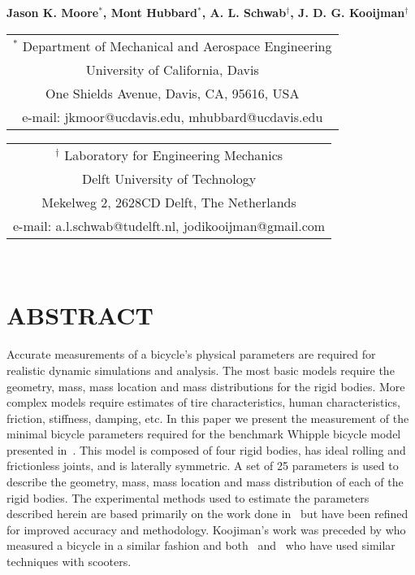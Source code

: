 \documentclass{bmd2010p}
\begin{document}
\begin{center}
\end{center}

\begin{center}
\normalsize{\bf{Jason K. Moore$^{*}$, Mont Hubbard$^{*}$, A. L. Schwab$^\dag$,
            J. D. G. Kooijman$^\dag$}}
\end{center}

\begin{center}
\begin{tabular}{c}
$^*$ Department of Mechanical and Aerospace Engineering\\
University of California, Davis\\
One Shields Avenue, Davis, CA, 95616, USA\\
e-mail: jkmoor@ucdavis.edu, mhubbard@ucdavis.edu\\
\end{tabular}
\begin{tabular}{c}
$^\dag$ Laboratory for Engineering Mechanics\\
Delft University of Technology\\
Mekelweg 2, 2628CD Delft, The Netherlands\\
e-mail: a.l.schwab@tudelft.nl, jodikooijman@gmail.com\\
\end{tabular} \\ \vspace{2.5ex}
\end{center}
\section*{ABSTRACT}
Accurate measurements of a bicycle's physical parameters are required for
realistic dynamic simulations and analysis. The most basic models require the
geometry, mass, mass location and mass distributions for the rigid bodies. More
complex models require estimates of tire characteristics, human
characteristics, friction, stiffness, damping, etc. In this
paper we present the measurement of the minimal bicycle parameters required for
the benchmark Whipple bicycle model presented in~\cite{Meijaard2007}. This
model is composed of four rigid bodies, has ideal rolling and frictionless joints,
and is laterally symmetric. A set of 25 parameters is used to describe the
geometry, mass, mass location and mass distribution of each of the rigid
bodies. The experimental methods used to estimate the parameters described
herein are based primarily on the work done in~\cite{Kooijman2006} but have
been refined for improved accuracy and methodology. Koojiman's work was
preceded by \cite{Roland1971} who measured a bicycle in a
similar fashion and both~\cite{Dohring1953} and~\cite{Singh1971} who have used
similar techniques with scooters.
\end{document}
